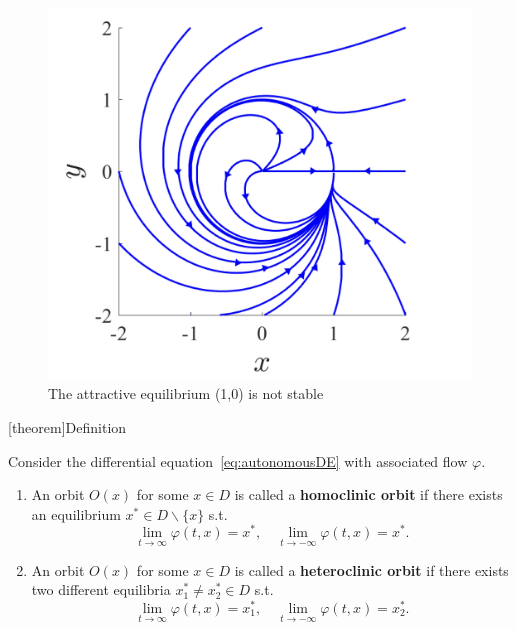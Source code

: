 \documentclass[12pt]{report}
\theoremstyle{definition}
\begin{document}
\begin{figure}
  	\includegraphics[scale=0.2]{./images/phase_portrait3.jpeg}
  	\centering
    \caption{The attractive equilibrium (1,0) is not stable}\label{phase_portrait3}
\end{figure}

[theorem]{Definition}
\begin{homoclinic and heteroclinic orbits}
    Consider the differential equation~\eqref{eq:autonomousDE} with associated flow
    $\varphi$.
    \begin{enumerate}[label = (\roman*)]
        \item An orbit $O(x)$ for some $x\in D$ is called a \textbf{homoclinic
            orbit} if there exists an equilibrium $x^*\in D\backslash\{x\}$ s.t.
            \[
                \lim_{t\rightarrow\infty}\varphi(t,x)=x^*,
                \quad \lim_{t\rightarrow-\infty}\varphi(t,x)=x^*.
            \]
        \item An orbit $O(x)$ for some $x\in D$ is called a \textbf{heteroclinic
            orbit} if there exists two different equilibria $x_1^{*}\neq
            x_2^{*}\in D$ s.t.
            \[
                \lim_{t\rightarrow\infty}\varphi(t,x)=x_1^{*},
                \quad \lim_{t\rightarrow-\infty}\varphi(t,x)=x_2^{*}.
            \]
    \end{enumerate} 
\end{homoclinic and heteroclinic orbits}
\end{document}
